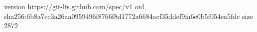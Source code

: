 version https://git-lfs.github.com/spec/v1
oid sha256:6b8a7cc3a26aa0959496f8766f8d1772a6684acf35ddef9fa6e0b5f054ea5fdc
size 2872
